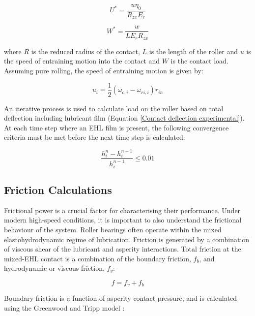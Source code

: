 \begin{enumerate}
	\begin{equation}\label{Ustar}
		U^*=\frac{u \eta_0}{R_{z x} E_r}
	\end{equation}
	
	\begin{equation}\label{Wstar}
		W^*=\frac{w}{L E_r R_{z x}}
	\end{equation}

	where $R$ is the reduced radius of the contact, $L$ is the length of the roller and $u$ is the speed of entraining motion into the contact and $W$ is the contact load. Assuming pure rolling, the speed of entraining motion is given by:
	
	\begin{equation}\label{entraining motion speed}
		u_i=\frac{1}{2}\left(\omega_{c, i}-\omega_{r i, i}\right) r_{i n}
	\end{equation}

	An iterative process is used to calculate load on the roller based on total deflection including lubricant film (Equation \ref{Contact deflection experimental}). At each time step where an EHL film is present, the following convergence criteria must be met before the next time step is calculated:
	
	\begin{equation}\label{film convergence}
		\frac{h_i^n-h_i^{n-1}}{h_i^{n-1}} \leq 0.01
	\end{equation}

\end{enumerate}

\subsection{Friction Calculations}
Frictional power is a crucial factor for characterising their performance. Under modern high-speed conditions, it is important to also understand the frictional behaviour of the system. Roller bearings often operate within the mixed elastohydrodynamic regime of lubrication. Friction is generated by a combination of viscous shear of the lubricant and asperity interactions. Total friction at the mixed-EHL contact is a combination of the boundary friction, $f_b$, and hydrodynamic or viscous friction, $f_v$:  

\begin{equation}\label{Total friction experimental}
	f=f_v+f_b
\end{equation}

Boundary friction is a function of asperity contact pressure, and is calculated using the Greenwood and Tripp model \cite{Greenwood1970}:

